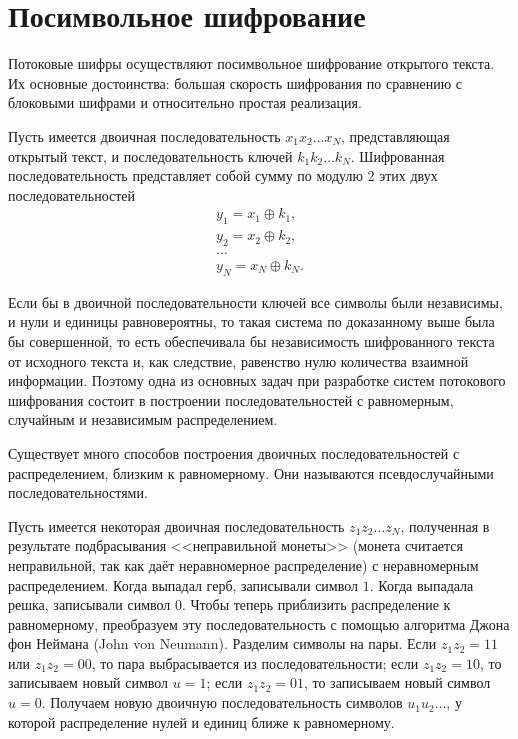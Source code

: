 ﻿\section{Посимвольное шифрование}

Потоковые шифры осуществляют посимвольное шифрование открытого текста. Их основные достоинства: большая скорость шифрования по сравнению с блоковыми шифрами и относительно простая реализация.

Пусть имеется двоичная последовательность $x_{1} x_{2} \dots x_{N}$, представляющая открытый текст, и последовательность ключей $k_{1} k_{2} \dots k_{N}$. Шифрованная последовательность представляет собой сумму по модулю 2 этих двух последовательностей
\[ \begin{array}{l}
    y_{1} = x_{1} \oplus k_{1}, \\
    y_{2} = x_{2} \oplus k_{2}, \\
    \dots \\
    y_{N} = x_{N} \oplus k_{N}.
\end{array} \]

Если бы в двоичной последовательности ключей все символы были независимы, и нули и единицы равновероятны, то такая система по доказанному выше была бы совершенной, то есть обеспечивала бы независимость шифрованного текста от исходного текста и, как следствие, равенство нулю количества взаимной информации. Поэтому одна из основных задач при разработке систем потокового шифрования состоит в построении последовательностей с равномерным, случайным и независимым распределением.

Существует много способов построения двоичных последовательностей с распределением, близким к равномерному. Они называются псевдослучайными последовательностями.

Пусть имеется некоторая двоичная последовательность $z_{1} z_{2} \ldots z_{N}$, полученная в результате подбрасывания <<неправильной монеты>> (монета считается неправильной, так как даёт неравномерное распределение) с неравномерным распределением. Когда выпадал герб, записывали символ $1$. Когда выпадала решка, записывали символ $0$. Чтобы теперь приблизить распределение к равномерному, преобразуем эту последовательность с помощью алгоритма Джона фон Неймана (John von Neumann). Разделим символы на пары. Если $z_{1} z_{2} = 11$ или $z_{1} z_{2} = 00$, то пара выбрасывается из последовательности; если $z_{1} z_{2} =10$, то записываем новый символ $u=1$; если $z_{1} z_{2} =01$, то записываем новый символ $u=0$. Получаем новую двоичную последовательность символов $u_{1}u_{2}\ldots $, у которой распределение нулей и единиц ближе к равномерному.
